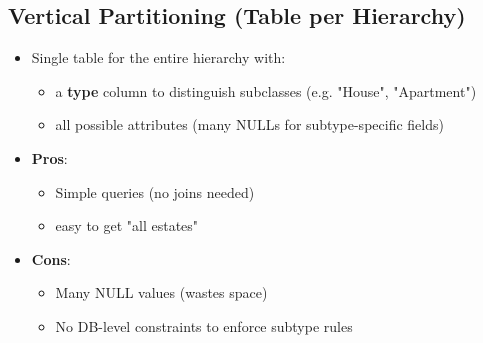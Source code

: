 \subsection{Vertical Partitioning (Table per Hierarchy)}
\begin{itemize}
	\item Single table for the entire hierarchy with: 
	\begin{itemize}
		\item a \textbf{type} column to distinguish subclasses (e.g. "House", "Apartment")
		\item all possible attributes (many NULLs for subtype-specific fields)
	\end{itemize}
	\item \textbf{Pros}:
	\begin{itemize}
		\item Simple queries (no joins needed)
		\item easy to get "all estates"
	\end{itemize}
	\item \textbf{Cons}:
	\begin{itemize}
		\item Many NULL values (wastes space)
		\item No DB-level constraints to enforce subtype rules 
	\end{itemize}
\end{itemize}
